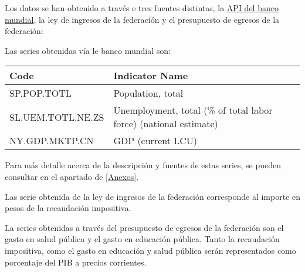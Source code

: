 \documentclass[]{book}
\theoremstyle{definition}
\theoremstyle{definition}
\theoremstyle{definition}
\theoremstyle{remark}
\begin{document}
Los datos se han obtenido a través e tres fuentes distintas, la
\href{https://blogs.worldbank.org/opendata/accessing-world-bank-data-apis-python-r-ruby-stata}{API
del banco mundial}, la ley de ingresos de la federación y el presupuesto
de egresos de la federación:

Las series obtenidas vía le banco mundial son:

\begin{longtable}[]{@{}ll@{}}
\toprule
\begin{minipage}[b]{0.08\columnwidth}\raggedright\strut
Code\strut
\end{minipage} & \begin{minipage}[b]{0.72\columnwidth}\raggedright\strut
Indicator Name\strut
\end{minipage}\tabularnewline
\midrule
\endhead
\begin{minipage}[t]{0.08\columnwidth}\raggedright\strut
SP.POP.TOTL\strut
\end{minipage} & \begin{minipage}[t]{0.72\columnwidth}\raggedright\strut
Population, total\strut
\end{minipage}\tabularnewline
\begin{minipage}[t]{0.08\columnwidth}\raggedright\strut
SL.UEM.TOTL.NE.ZS\strut
\end{minipage} & \begin{minipage}[t]{0.72\columnwidth}\raggedright\strut
Unemployment, total (\% of total labor force) (national estimate)\strut
\end{minipage}\tabularnewline
\begin{minipage}[t]{0.08\columnwidth}\raggedright\strut
NY.GDP.MKTP.CN\strut
\end{minipage} & \begin{minipage}[t]{0.72\columnwidth}\raggedright\strut
GDP (current LCU)\strut
\end{minipage}\tabularnewline
\bottomrule
\end{longtable}

Para más detalle acerca de la descripción y fuentes de estas series, se
pueden consultar en el apartado de \ref{Anexos}.

Las serie obtenida de la ley de ingresos de la federación corresponde al
importe en pesos de la recaudación impositiva.

La series obtenidas a través del presupuesto de egresos de la federación
son el gasto en salud pública y el gasto en educación pública. Tanto la
recaudación impositiva, como el gasto en educación y salud pública serán
representados como porcentaje del PIB a precios corrientes.
\end{document}
